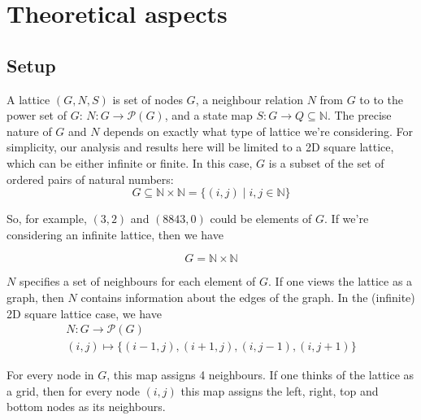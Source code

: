 
\chapter{Theoretical aspects}

\label{ch:classicpercolation} %



\section{Setup}

A lattice $(G, N, S)$ is set of nodes $G$, a neighbour relation $N$ from $G$ to to the power set of $G$: $N \colon G \to \mathcal{P}(G)$, and a state map $S \colon G \to Q \subseteq \mathbb{N}$. The precise nature of $G$ and $N$ depends on exactly what type of lattice we're considering. For simplicity, our analysis and results here will be limited to a 2D square lattice, which can be either infinite or finite.
In this case, $G$ is a subset of the set of ordered pairs of natural numbers: 
\begin{equation}
    G \subseteq \mathbb{N} \times \mathbb{N} = \{(i, j) \mid i, j \in \mathbb{N}\}
\end{equation}

So, for example, $(3, 2)$ and $(8843, 0)$ could be elements of $G$.
If we're considering an infinite lattice, then we have 

$$ 
G = \mathbb{N} \times \mathbb{N}
$$ 

$N$ specifies a set of neighbours for each element of $G$. If one views the lattice as a graph, then $N$ contains information about the edges of the graph. In the (infinite) 2D square lattice case, we have 
\begin{equation}
\begin{gathered}
N \colon G \to \mathcal{P}(G) \\
(i, j) \mapsto \{ (i-1, j), (i+1, j), (i, j-1), (i, j+1) \} 
\end{gathered}
\end{equation}

For every node in $G$, this map assigns 4 neighbours. If one thinks of the lattice as a grid, then for every node $(i, j)$ this map assigns the left, right, top and bottom nodes as its neighbours.

